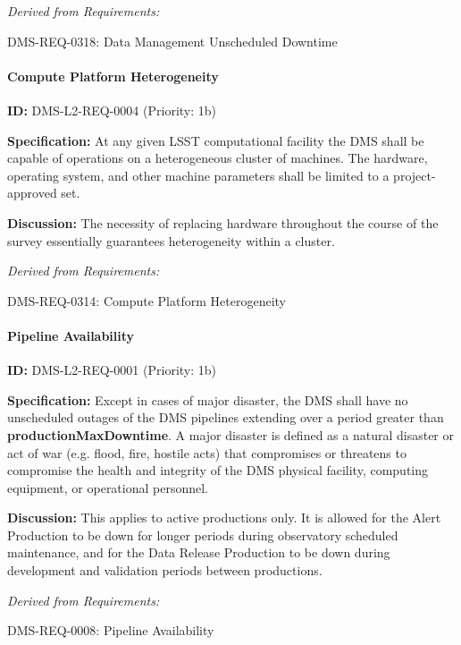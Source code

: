 \documentclass[SE,toc,lsstdraft]{lsstdoc}
\begin{document}
\emph{Derived from Requirements:}

DMS-REQ-0318:
Data Management Unscheduled Downtime \newline

\paragraph{Compute Platform Heterogeneity}\hfill  %

\label{DMS-L2-REQ-0004}
\textbf{ID:} DMS-L2-REQ-0004 (Priority: 1b)

\textbf{Specification:} At any given LSST computational facility the DMS shall be capable of operations on a heterogeneous cluster of machines. The hardware, operating system, and other machine parameters shall be limited to a project-approved set.

\textbf{Discussion: }The necessity of replacing hardware throughout the course of the survey essentially guarantees heterogeneity within a cluster.

\emph{Derived from Requirements:}

DMS-REQ-0314:
Compute Platform Heterogeneity \newline

\paragraph{Pipeline Availability}\hfill  %

\label{DMS-L2-REQ-0001}
\textbf{ID:} DMS-L2-REQ-0001 (Priority: 1b)

\textbf{Specification:} Except in cases of major disaster, the DMS shall have no unscheduled outages of the DMS pipelines extending over a period greater than \textbf{productionMaxDowntime}.  A major disaster is defined as a natural disaster or act of war (e.g. flood, fire, hostile acts) that compromises or threatens to compromise the health and integrity of the DMS physical facility, computing equipment, or operational personnel.

\textbf{Discussion:} This applies to active productions only. It is allowed for the Alert Production to be down for longer periods during observatory scheduled maintenance, and for the Data Release Production to be down during development and validation periods between productions.

\emph{Derived from Requirements:}

DMS-REQ-0008:
Pipeline Availability \newline
\end{document}
